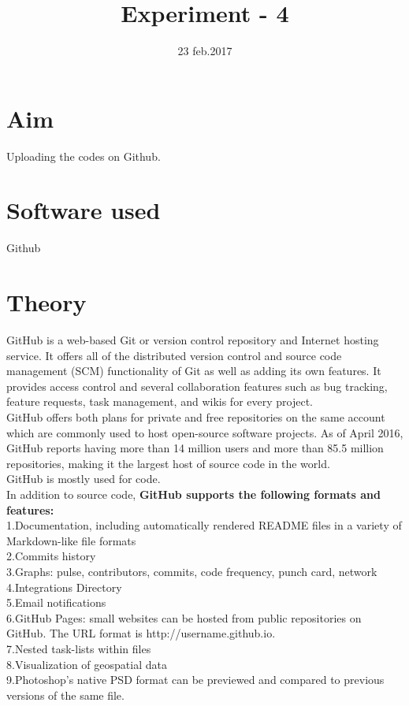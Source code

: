 \documentclass[100pt]{article}
\title{Experiment - 4} %
\date{23 feb.2017} %
\begin{document}
		\maketitle %
	\section{Aim}
    Uploading the codes on Github.
	\section{Software used}
     Github
	\section{Theory}
    GitHub is a web-based Git or version control repository and Internet hosting service. It offers all of the distributed version control and source code management (SCM) functionality of Git as well as adding its own features. It provides access control and several collaboration features such as bug tracking, feature requests, task management, and wikis for every project.\\
	GitHub offers both plans for private and free repositories on the same account which are commonly used to host open-source software projects. As of April 2016, GitHub reports having more than 14 million users and more than 85.5 million repositories, making it the largest host of source code in the world.\\
	
	 GitHub is mostly used for code.\\
	In addition to source code, \textbf{GitHub supports the following formats and features:}\\
	
  	1.Documentation, including automatically rendered README files in a variety of  Markdown-like file formats\\
	2.Commits history\\
	3.Graphs: pulse, contributors, commits, code frequency, punch card, network\\
	4.Integrations Directory\\
	5.Email notifications\\
	6.GitHub Pages: small websites can be hosted from public repositories on GitHub. The URL format is http://username.github.io.\\
	7.Nested task-lists within files\\
	8.Visualization of geospatial data\\
	9.Photoshop's native PSD format can be previewed and compared to previous versions of the same file.\\
	
\end{document}
